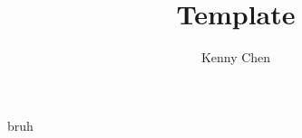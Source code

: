 \documentclass[12pt]{report}
\title{Template}
\author{Kenny Chen}
\begin{document}
\maketitle
\tableofcontents
\newpage

\unit{bruh}

\end{document}

